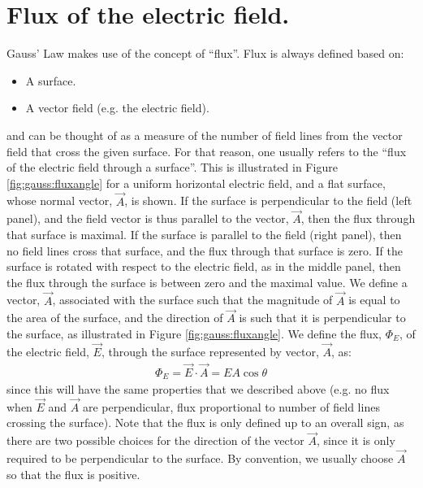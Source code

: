 \section{Flux of the electric field.}
Gauss' Law makes use of the concept of ``flux''. Flux is always defined based on:
\begin{itemize}
\item A surface.
\item A vector field (e.g. the electric field). 
\end{itemize}
and can be thought of as a measure of the number of field lines from the vector field that cross the given surface. For that reason, one usually refers to the ``flux of the electric field through a surface''. This is illustrated in Figure \ref{fig:gauss:fluxangle} for a uniform horizontal electric field, and a flat surface, whose normal vector, $\vec A$, is shown. If the surface is perpendicular to the field (left panel), and the field vector is thus parallel to the vector, $\vec A$, then the flux through that surface is maximal. If the surface is parallel to the field (right panel), then no field lines cross that surface, and the flux through that surface is zero. If the surface is rotated with respect to the electric field, as in the middle panel, then the flux through the surface is between zero and the maximal value.
We define a vector, $\vec A$, associated with the surface such that the magnitude of $\vec A$ is equal to the area of the surface, and the direction of $\vec A$ is such that it is perpendicular to the surface, as illustrated in Figure \ref{fig:gauss:fluxangle}. We define the flux, $\Phi_E$, of the electric field, $\vec E$, through the surface represented by vector, $\vec A$, as:
\begin{align*}
\Phi_E=\vec E\cdot \vec A=EA\cos\theta
\end{align*}
since this will have the same properties that we described above (e.g. no flux when $\vec E$ and $\vec A$ are perpendicular, flux proportional to number of field lines crossing the surface). Note that the flux is only defined up to an overall sign, as there are two possible choices for the direction of the vector $\vec A$, since it is only required to be perpendicular to the surface. By convention, we usually choose $\vec A$ so that the flux is positive.

